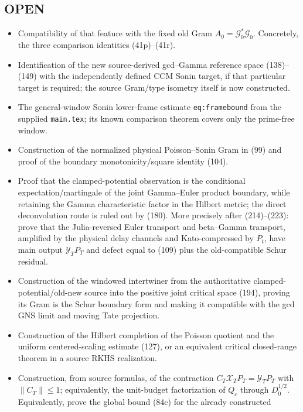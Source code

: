 \documentclass[11pt]{article}
\begin{document}
\subsection*{OPEN}
\begin{itemize}
\item Compatibility of that feature with the fixed old Gram
      $A_0=\mathcal G_0^*\mathcal G_0$.
      Concretely, the three comparison identities (41p)--(41r).
\item Identification of the new source-derived gcd--Gamma reference space
      (138)--(149) with the independently defined CCM Sonin target, if that
      particular target is required; the source Gram/type isometry itself is
      now constructed.
\item The general-window Sonin lower-frame estimate
      \texttt{eq:framebound} from the supplied \texttt{main.tex}; its known
      comparison theorem covers only the prime-free window.
\item Construction of the normalized physical Poisson--Sonin Gram in (99)
      and proof of the boundary monotonicity/square identity (104).
\item Proof that the clamped-potential observation is the conditional
      expectation/martingale of the joint Gamma--Euler product boundary,
      while retaining the Gamma characteristic factor in the Hilbert metric;
      the direct deconvolution route is ruled out by (180).
      More precisely after (214)--(223): prove that the Julia-reversed Euler
      transport and beta--Gamma transport, amplified by the physical delay
      channels and Kato-compressed by $P_t$, have main output
      $\mathcal Y_TP_T$ and defect equal to (109) plus the old-compatible
      Schur residual.
\item Construction of the windowed intertwiner from the authoritative
      clamped-potential/old-new source into the positive joint critical space
      (194), proving its Gram is the Schur boundary form and making it
      compatible with the gcd GNS limit and moving Tate projection.
\item Construction of the Hilbert completion of the Poisson quotient and the
      uniform centered-scaling estimate (127), or an equivalent critical
      closed-range theorem in a source RKHS realization.
\item Construction, from source formulas, of the contraction
      $C_T\mathcal X_TP_T=\mathcal Y_TP_T$ with $\|C_T\|\le1$; equivalently,
      the unit-budget factorization of $Q_c$ through $D_0^{1/2}$.
      Equivalently, prove the global bound (84c) for the already constructed

\end{itemize}
\end{document}
